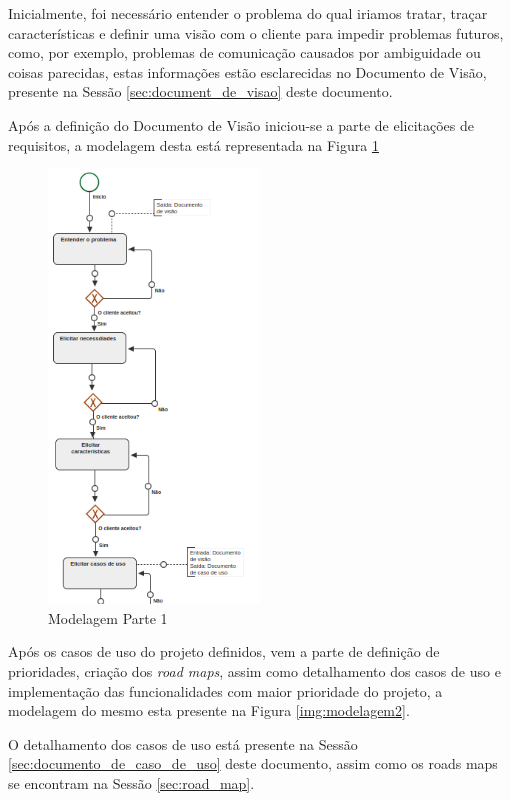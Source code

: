 
Inicialmente, foi necessário entender o problema do qual iriamos tratar, traçar características e definir uma visão com o cliente para impedir problemas futuros, como, por exemplo, problemas de comunicação causados por ambiguidade ou coisas parecidas, estas informações estão esclarecidas no Documento de Visão, presente na Sessão \ref{sec:document_de_visao} deste documento.

Após a definição do Documento de Visão iniciou-se a parte de elicitações de requisitos, a modelagem desta está representada na Figura \ref{img:modelagem1}

\begin{figure}[H]
	\centering
	\includegraphics[width=0.5\textwidth]{imgModelagem/modelagem1}
	\caption{Modelagem Parte 1}
	\label{img:modelagem1}
\end{figure}

Após os casos de uso do projeto definidos, vem a parte de definição de prioridades, criação dos \textit{road maps}, assim como detalhamento dos casos de uso e implementação das funcionalidades com maior prioridade do projeto, a modelagem do mesmo esta presente na Figura \ref{img:modelagem2}.

O detalhamento dos casos de uso está presente na Sessão \ref{sec:documento_de_caso_de_uso} deste documento, assim como os roads maps se encontram na Sessão \ref{sec:road_map}.

